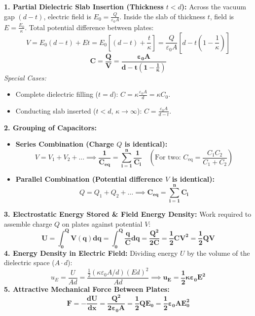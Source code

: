\documentclass[10pt,twoside,openright]{book}
\begin{document}
\begin{formulabox}
\textbf{1. Partial Dielectric Slab Insertion (Thickness $t < d$):}
Across the vacuum gap $(d-t)$, electric field is $E_0 = \frac{Q}{\varepsilon_0 A}$. Inside the slab of thickness $t$, field is $E = \frac{E_0}{\kappa}$.
Total potential difference between plates:
\begin{equation}
  V = E_0 (d - t) + E t = E_0 \left[(d - t) + \frac{t}{\kappa}\right] = \frac{Q}{\varepsilon_0 A} \left[d - t\left(1 - \frac{1}{\kappa}\right)\right]
\end{equation}
\begin{equation}
  \mathbf{C = \frac{Q}{V} = \frac{\varepsilon_0 A}{d - t\left(1 - \frac{1}{\kappa}\right)}}
\end{equation}
\textit{Special Cases:}
\begin{itemize}
  \item Complete dielectric filling ($t=d$): $C = \kappa \frac{\varepsilon_0 A}{d} = \kappa C_0$.
  \item Conducting slab inserted ($t < d$, $\kappa \to \infty$): $C = \frac{\varepsilon_0 A}{d - t}$.
\end{itemize}
\textbf{2. Grouping of Capacitors:}
\begin{itemize}
  \item \textbf{Series Combination (Charge $Q$ is identical):}
  \begin{equation}
    V = V_1 + V_2 + \dots \implies \mathbf{\frac{1}{C_{\text{eq}}} = \sum_{i=1}^n \frac{1}{C_i}} \quad \left(\text{For two: } C_{\text{eq}} = \frac{C_1 C_2}{C_1 + C_2}\right)
  \end{equation}
  \item \textbf{Parallel Combination (Potential difference $V$ is identical):}
  \begin{equation}
    Q = Q_1 + Q_2 + \dots \implies \mathbf{C_{\text{eq}} = \sum_{i=1}^n C_i}
  \end{equation}
\end{itemize}
\textbf{3. Electrostatic Energy Stored \& Field Energy Density:}
Work required to assemble charge $Q$ on plates against potential $V$:
\begin{equation}
  \mathbf{U = \int_0^Q V(q) dq = \int_0^Q \frac{q}{C} dq = \frac{Q^2}{2C} = \frac{1}{2} C V^2 = \frac{1}{2} Q V}
\end{equation}
\textbf{4. Energy Density in Electric Field:}
Dividing energy $U$ by the volume of the dielectric space ($A \cdot d$):
\begin{equation}
  u_E = \frac{U}{Ad} = \frac{\frac{1}{2}(\kappa \varepsilon_0 A/d)(Ed)^2}{Ad} \implies \mathbf{u_E = \frac{1}{2} \kappa \varepsilon_0 E^2}
\end{equation}
\textbf{5. Attractive Mechanical Force Between Plates:}
\begin{equation}
  \mathbf{F = -\frac{dU}{dx} = \frac{Q^2}{2\varepsilon_0 A} = \frac{1}{2} Q E_0 = \frac{1}{2} \varepsilon_0 A E_0^2}
\end{equation}
\end{formulabox}
\end{document}
